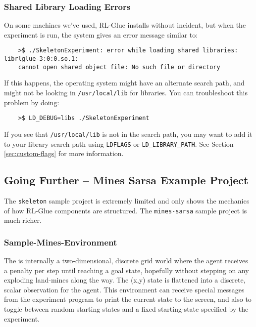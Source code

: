 \documentclass[11pt]{article}
\begin{document}
\subsubsection{Shared Library Loading Errors}
\label{sec:gotchas-shared-libs}
On some machines we've used, RL-Glue installs without incident, but when the experiment is run, the system gives an error message similar to:
\begin{verbatim}
	>$ ./SkeletonExperiment: error while loading shared libraries: librlglue-3:0:0.so.1:
	cannot open shared object file: No such file or directory
\end{verbatim}

If this happens, the operating system might have an alternate search path, and might not be looking in \texttt{/usr/local/lib} for libraries. 
You can troubleshoot this problem by doing:
\begin{verbatim}
	>$ LD_DEBUG=libs ./SkeletonExperiment
\end{verbatim}
If you see that \texttt{/usr/local/lib} is not in the search path, you may want to add it to your library search path using \texttt{LDFLAGS} or \texttt{LD\_LIBRARY\_PATH}.  See Section \ref{sec:custom-flags} for more information.  



\subsection{Going Further -- Mines Sarsa Example Project}
\label{mines-sarsa-sample}
The \texttt{skeleton} sample project is extremely limited and only shows the mechanics of how RL-Glue components are structured.  The \texttt{mines-sarsa} sample project is much richer.

\subsubsection{Sample-Mines-Environment}
\label{mines-sample}
The 
is internally a two-dimensional, discrete grid world where the agent receives a penalty per step until reaching a goal state, hopefully without stepping on any exploding land-mines along the way.  The (x,y) state is flattened into a discrete, scalar observation for the agent.  This environment can receive special messages from the experiment program to print the current state to the screen, and also to toggle between random starting states and a fixed starting-state specified by the experiment.
\end{document}
